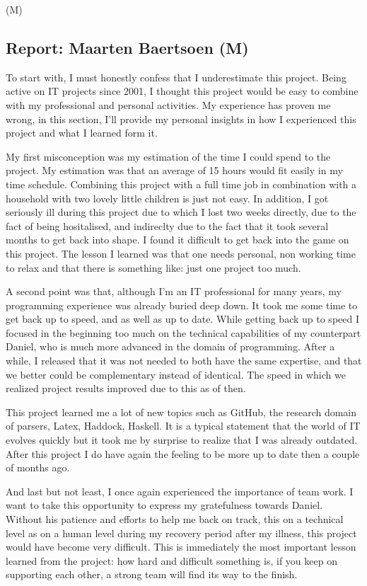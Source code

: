 (M)
\subsection{Report: Maarten Baertsoen (M)}
\label{subsec:assessment-maarten}
To start with, I must honestly confess that I underestimate this project.
Being active on IT projects since 2001, I thought this project would be easy to combine with my professional and personal activities.
My experience has proven me wrong, in this section, I'll provide my personal insights in how I experienced this project and what I learned form it.

My first misconception was my estimation of the time I could spend to the project.
My estimation was that an average of 15 hours would fit easily in my time schedule.
Combining this project with a full time job in combination with a household with two lovely little children is just not easy.
In addition, I got seriously ill during this project due to which I lost two weeks directly, due to the fact of being hositalised, and indireclty due to the fact that it took several months to get back into shape.
I found it difficult to get back into the game on this project.
The lesson I learned was that one needs personal, non working time to relax and that there is something like: just one project too much.

A second point was that, although I'm an IT professional for many years, my programming experience was already buried deep down.
It took me some time to get back  up to speed, and as well as up to date.
While getting back up to speed I focused in the beginning too much on the technical capabilities of my counterpart Daniel, who is much more advanced in the domain of programming. 
After a while, I released that it was not needed to both have the same expertise, and that we better could be complementary instead of identical.
The speed in which we realized project results improved due to this as of then.

This project learned me a lot of new topics such as GitHub, the research domain of parsers, Latex, Haddock, Haskell.
It is a typical statement that the world of IT evolves quickly but it took me by surprise to realize that I was already outdated.
After this project I do have again the feeling to be more up to date then a couple of months ago.

And last but not least, I once again experienced the importance of team work.
I want to take this opportunity to express my gratefulness towards Daniel.
Without his patience and efforts to help me back on track, this on a technical level as on a human level during my recovery period after my illness, this project would have become very difficult. 
This is immediately the most important lesson learned from the project: how hard and difficult something is, if you keep on supporting each other, a strong team will find its way to the finish.





